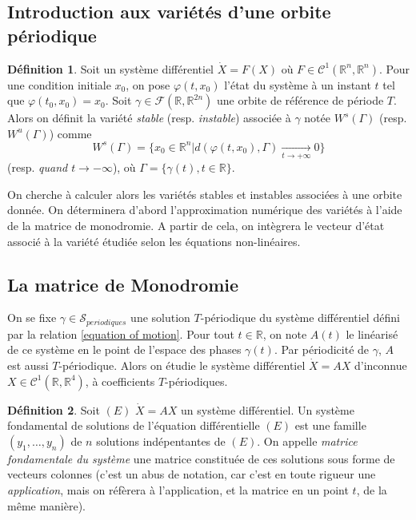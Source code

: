 \documentclass[12pt]{article}
\theoremstyle{definition}
\newtheorem*{definition}{Définition}
\theoremstyle{definition}
\begin{document}
	\subsection{Introduction aux variétés d'une orbite périodique}
	\begin{definition}
		Soit un système différentiel $\dot{X} = F(X)$ où $F \in \mathcal{C}^1(\mathbb{R}^n, \mathbb{R}^n)$. Pour une condition initiale $x_0$, on pose $\varphi(t,x_0)$ l'état du système à un instant $t$ tel que $\varphi(t_0,x_0)=x_0$. Soit $\gamma \in \mathcal{F}(\mathbb{R}, \mathbb{R}^{2n})$ une orbite de référence de période $T$. Alors on définit la variété \emph{stable} (resp. \emph{instable}) associée à $\gamma$ notée $W^s(\Gamma)$ (resp. $W^u(\Gamma)$) comme
		\begin{equation*}
			W^s(\Gamma) = \{ x_0 \in \mathbb{R}^n | d(\varphi(t,x_0),\Gamma) \underset{t \to  +\infty}{\longrightarrow} 0 \}
		\end{equation*}
		(resp. \textit{quand $t \to -\infty$}), où $\Gamma = \{\gamma(t), t\in\mathbb{R}\}$.
		
	\end{definition}
	On cherche à calculer alors les variétés stables et instables associées à une orbite donnée. On déterminera d'abord l'approximation numérique des variétés à l'aide de la matrice de monodromie. A partir de cela, on intègrera le vecteur d'état associé à la variété étudiée selon les équations non-linéaires.
	
	\subsection{La matrice de Monodromie}
	On se fixe $\gamma \in \mathcal{S}_{periodiques}$ une solution $T$-périodique du système différentiel défini par la relation \ref{equation of motion}. Pour tout $t \in \mathbb{R}$, on note $A(t)$ le linéarisé de ce système en le point de l'espace des phases $\gamma(t)$. Par périodicité de $\gamma$, $A$ est aussi $T$-périodique. Alors on étudie le système différentiel $\dot{X} = AX$ d'inconnue $X \in \mathcal{C}^1(\mathbb{R}, \mathbb{R}^4)$, à coefficients $T$-périodiques.
	\begin{definition}
		Soit $(E)$ $\dot{X} = AX$ un système différentiel. Un système fondamental de solutions de l'équation différentielle $(E)$ est une famille $(y_1,\dots,y_n)$ de $n$ solutions indépentantes de $(E)$. On appelle \emph{matrice fondamentale du système} une matrice constituée de ces solutions sous forme de vecteurs colonnes (c'est un abus de notation, car c'est en toute rigueur une \textit{application}, mais on réfèrera à l'application, et la matrice en un point $t$, de la même manière).
	\end{definition}
	
\end{document}
